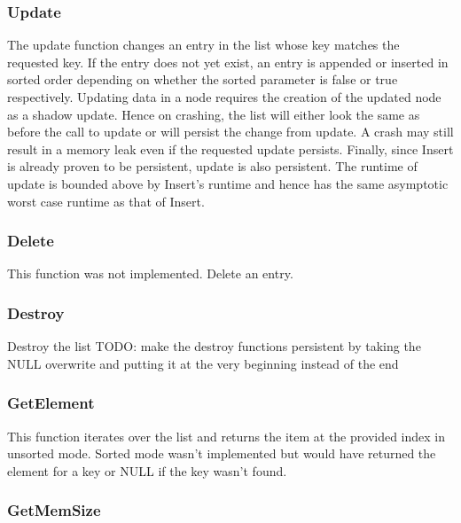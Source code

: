 \documentclass[twocolumn]{article}
\begin{document}
\subsubsection{Update}


The update function changes an entry in the list whose key matches the requested
key. If the entry does not yet exist, an entry is appended or inserted in sorted
order depending on whether the sorted parameter is false or true respectively.
Updating data in a node requires the creation of the updated node as a shadow
update. Hence on crashing, the list will either look the same as before the call
to update or will persist the change from update. A crash may still result in a
memory leak even if the requested update persists. Finally, since Insert is
already proven to be persistent, update is also persistent. The runtime of
update is bounded above by Insert's runtime and hence has the same asymptotic
worst case runtime as that of Insert.

\subsubsection{Delete}

This function was not implemented. Delete an entry.

\subsubsection{Destroy}

Destroy the list
TODO: make the destroy functions persistent by taking the NULL overwrite and
putting it at the very beginning instead of the end

\subsubsection{GetElement}

This function iterates over the list and returns the item at the provided index
in unsorted mode. Sorted mode wasn't implemented but would have returned the
element for a key or NULL if the key wasn't found.

\subsubsection{GetMemSize}
\end{document}
